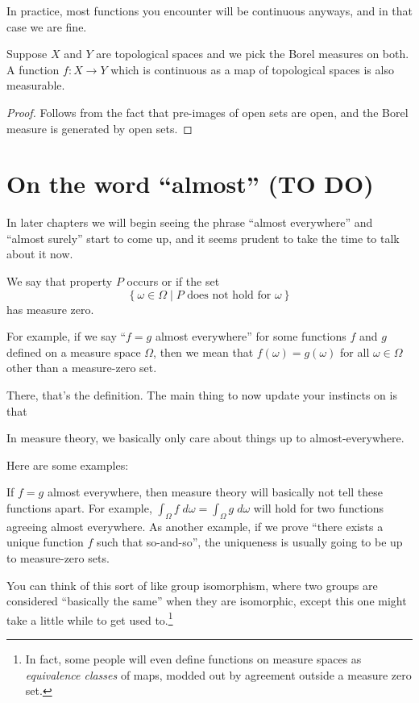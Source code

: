 In practice, most functions you encounter will be continuous anyways,
and in that case we are fine.
\begin{proposition}
	Suppose $X$ and $Y$ are topological spaces
	and we pick the Borel measures on both.
	A function $f \colon X \to Y$
	which is continuous as a map of topological spaces
	is also measurable.
\end{proposition}
\begin{proof}
	Follows from the fact that pre-images of open sets are open,
	and the Borel measure is generated by open sets.
\end{proof}

\section{On the word ``almost'' (TO DO)}
In later chapters we will begin seeing the phrase ``almost everywhere''
and ``almost surely'' start to come up,
and it seems prudent to take the time to talk about it now.

\begin{definition}
	We say that property $P$ occurs
	 or  if the set
	\[ \left\{ \omega \in \Omega \mid \text{$P$ does not hold for $\omega$} \right\} \]
	has measure zero.
\end{definition}

For example, if we say ``$f = g$ almost everywhere''
for some functions $f$ and $g$ defined on a measure space $\Omega$,
then we mean that $f(\omega) = g(\omega)$ for all $\omega \in \Omega$
other than a measure-zero set.

There, that's the definition.
The main thing to now update your instincts on is that
\begin{moral}
	In measure theory,
	we basically only care about things up to almost-everywhere.
\end{moral}
Here are some examples:
\begin{itemize}
	\ii If $f=g$ almost everywhere,
	then measure theory will basically not tell these functions apart.
	For example, $\int_\Omega f \; d\omega = \int_\Omega g \; d\omega$
	will hold for two functions agreeing almost everywhere.
	\ii As another example,
	if we prove ``there exists a unique function $f$ such that so-and-so'',
	the uniqueness is usually going to be up to measure-zero sets.
\end{itemize}
You can think of this sort of like group isomorphism,
where two groups are considered ``basically the same'' when they are isomorphic,
except this one might take a little while to get used to.\footnote{In fact,
	some people will even define functions on measure spaces
	as \emph{equivalence classes} of maps,
	modded out by agreement outside a measure zero set.}

